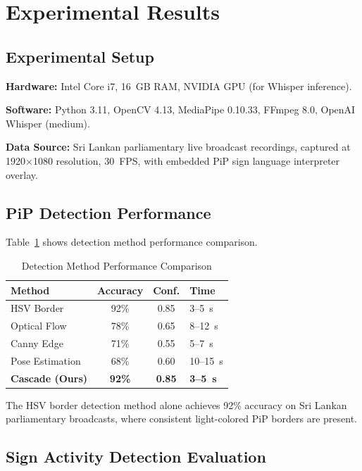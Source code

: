 \documentclass[journal]{IEEEtran}
\begin{document}
\section{Experimental Results}
\label{sec:results}

\subsection{Experimental Setup}

\textbf{Hardware:} Intel Core i7, 16~GB RAM, NVIDIA GPU (for Whisper inference).

\textbf{Software:} Python 3.11, OpenCV 4.13, MediaPipe 0.10.33, FFmpeg 8.0, OpenAI Whisper (medium).

\textbf{Data Source:} Sri Lankan parliamentary live broadcast recordings, captured at 1920$\times$1080 resolution, 30~FPS, with embedded PiP sign language interpreter overlay.

\subsection{PiP Detection Performance}

Table~\ref{tab:detection_perf} shows detection method performance comparison.

\begin{table}[htbp]
\centering
\caption{Detection Method Performance Comparison}
\label{tab:detection_perf}
\begin{tabular}{@{}lccl@{}}
\toprule
\textbf{Method} & \textbf{Accuracy} & \textbf{Conf.} & \textbf{Time} \\ \midrule
HSV Border & 92\% & 0.85 & 3--5~s \\
Optical Flow & 78\% & 0.65 & 8--12~s \\
Canny Edge & 71\% & 0.55 & 5--7~s \\
Pose Estimation & 68\% & 0.60 & 10--15~s \\
\textbf{Cascade (Ours)} & \textbf{92\%} & \textbf{0.85} & \textbf{3--5~s} \\
\bottomrule
\end{tabular}
\end{table}

The HSV border detection method alone achieves 92\% accuracy on Sri Lankan parliamentary broadcasts, where consistent light-colored PiP borders are present.

\subsection{Sign Activity Detection Evaluation}
\end{document}
